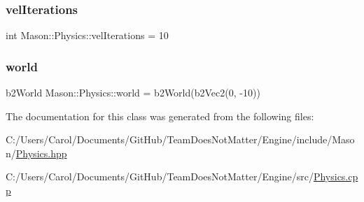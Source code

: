 \hypertarget{class_mason_1_1_physics_ab93e9c5caf8cb0964ceedc2161fac86d}{}\label{class_mason_1_1_physics_ab93e9c5caf8cb0964ceedc2161fac86d} 
\subsubsection{\texorpdfstring{vel\+Iterations}{velIterations}}
{\footnotesize\ttfamily int Mason\+::\+Physics\+::vel\+Iterations = 10}

\hypertarget{class_mason_1_1_physics_a7740dc3712e10eb4258774b76daeb2f6}{}\label{class_mason_1_1_physics_a7740dc3712e10eb4258774b76daeb2f6} 
\subsubsection{\texorpdfstring{world}{world}}
{\footnotesize\ttfamily b2\+World Mason\+::\+Physics\+::world = b2\+World(b2\+Vec2(0, -\/10))}



The documentation for this class was generated from the following files\+:\begin{DoxyCompactItemize}
\item 
C\+:/\+Users/\+Carol/\+Documents/\+Git\+Hub/\+Team\+Does\+Not\+Matter/\+Engine/include/\+Mason/\hyperlink{_physics_8hpp}{Physics.\+hpp}\item 
C\+:/\+Users/\+Carol/\+Documents/\+Git\+Hub/\+Team\+Does\+Not\+Matter/\+Engine/src/\hyperlink{_physics_8cpp}{Physics.\+cpp}\end{DoxyCompactItemize}
